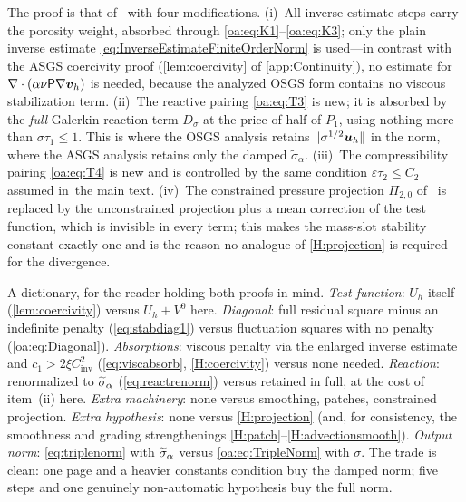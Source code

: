 \begin{remark}
\label{oa:rem:proofstructure}
The proof is that of~\cite[Theorem~1]{codina2008analysis} with four modifications. (i)~All
inverse-estimate steps carry the porosity weight, absorbed through
\cref{oa:eq:K1}--\cref{oa:eq:K3}; only the plain inverse estimate
\cref{eq:InverseEstimateFiniteOrderNorm} is used---in contrast with the ASGS coercivity proof
(\cref{lem:coercivity} of \cref{app:Continuity}), no estimate for $\nabla\cdot(\alpha\nu\mathsf{P}\nabla\boldsymbol{v}_h)$ is
needed, because the analyzed OSGS form contains no viscous stabilization term.
(ii)~The reactive pairing \cref{oa:eq:T3} is new; it is absorbed by the \emph{full}
Galerkin reaction term $D_\sigma$ at the price of half of $P_1$, using nothing more
than $\sigma\tau_1 \le 1$. This is where the OSGS analysis retains
$\lVert \sigma^{1/2}\boldsymbol{u}_h \rVert$ in the norm, where the ASGS analysis retains only the
damped $\widetilde{\sigma}_\alpha$. (iii)~The compressibility pairing \cref{oa:eq:T4} is
new and is controlled by the same condition $\varepsilon\tau_2 \le C_2$ assumed
in~the main text. (iv)~The constrained pressure projection $\Pi_{2,0}$
of~\cite{codina2008analysis} is replaced by the unconstrained projection plus a mean
correction of the test function, which is invisible in every term; this makes the
mass-slot stability constant exactly one and is the reason no analogue of
\cref{H:projection} is required for the divergence.
\end{remark}

\begin{pedagogy}
A dictionary, for the reader holding both proofs in mind. \emph{Test function}:
$U_h$ itself (\cref{lem:coercivity}) versus $U_h + V^0$ here. \emph{Diagonal}:
full residual square minus an indefinite penalty (\cref{eq:stabdiag1}) versus
fluctuation squares with no penalty (\cref{oa:eq:Diagonal}).
\emph{Absorptions}: viscous penalty via the enlarged inverse estimate and
$c_1 > 2\xi C_{\mathrm{inv}}^2$ (\cref{eq:viscabsorb}, \cref{H:coercivity})
versus none needed. \emph{Reaction}: renormalized to $\widetilde{\sigma}_{\alpha}$
(\cref{eq:reactrenorm}) versus retained in full, at the cost of item~(ii)
here. \emph{Extra machinery}: none versus smoothing, patches, constrained
projection. \emph{Extra hypothesis}: none versus \cref{H:projection} (and, for consistency, the smoothness and grading strengthenings \cref{H:patch}--\cref{H:advectionsmooth}).
\emph{Output norm}: \cref{eq:triplenorm} with $\widetilde{\sigma}_{\alpha}$ versus
\cref{oa:eq:TripleNorm} with $\sigma$. The trade is clean: one page and a
heavier constants condition buy the damped norm; five steps and one genuinely
non-automatic hypothesis buy the full norm.
\end{pedagogy}

